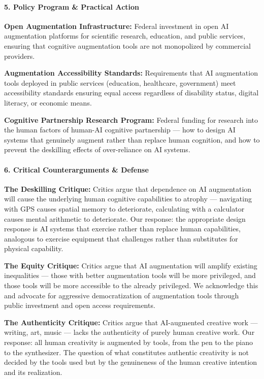 \paragraph{5. Policy Program \& Practical
Action}\label{policy-program-practical-action-18}

\textbf{Open Augmentation Infrastructure:} Federal investment in open AI
augmentation platforms for scientific research, education, and public
services, ensuring that cognitive augmentation tools are not monopolized
by commercial providers.

\textbf{Augmentation Accessibility Standards:} Requirements that AI
augmentation tools deployed in public services (education, healthcare,
government) meet accessibility standards ensuring equal access
regardless of disability status, digital literacy, or economic means.

\textbf{Cognitive Partnership Research Program:} Federal funding for
research into the human factors of human-AI cognitive partnership ---
how to design AI systems that genuinely augment rather than replace
human cognition, and how to prevent the deskilling effects of
over-reliance on AI systems.

\paragraph{6. Critical Counterarguments \&
Defense}\label{critical-counterarguments-defense-18}

\textbf{The Deskilling Critique:} Critics argue that dependence on AI
augmentation will cause the underlying human cognitive capabilities to
atrophy --- navigating with GPS causes spatial memory to deteriorate,
calculating with a calculator causes mental arithmetic to deteriorate.
Our response: the appropriate design response is AI systems that
exercise rather than replace human capabilities, analogous to exercise
equipment that challenges rather than substitutes for physical
capability.

\textbf{The Equity Critique:} Critics argue that AI augmentation will
amplify existing inequalities --- those with better augmentation tools
will be more privileged, and those tools will be more accessible to the
already privileged. We acknowledge this and advocate for aggressive
democratization of augmentation tools through public investment and open
access requirements.

\textbf{The Authenticity Critique:} Critics argue that AI-augmented
creative work --- writing, art, music --- lacks the authenticity of
purely human creative work. Our response: all human creativity is
augmented by tools, from the pen to the piano to the synthesizer. The
question of what constitutes authentic creativity is not decided by the
tools used but by the genuineness of the human creative intention and
its realization.

